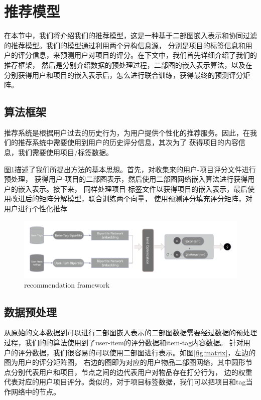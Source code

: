 \documentclass[lang=cn,11pt]{elegantpaper}
\begin{document}
\section{推荐模型}

在本节中，我们将介绍我们的推荐模型，这是一种基于二部图嵌入表示和协同过滤的推荐模型。我们的模型通过利用两个异构信息源，
分别是项目的标签信息和用户的评分信息，来预测用户对项目的评分。在下文中，我们首先详细介绍了我们的推荐框架，
然后是分别介绍数据的预处理过程，二部图的嵌入表示算法，以及在分别获得用户和项目的嵌入表示后，怎么进行联合训练，获得最终的预测评分矩阵。

\subsection{算法框架}
推荐系统是根据用户过去的历史行为，为用户提供个性化的推荐服务。因此，在我们的推荐系统中需要使用到用户的历史评分信息，其次为了
获得项目的内容信息，我们需要使用项目/标签数据。

图\ref{fig:framwork}描述了我们所提出方法的基本思想。首先，对收集来的用户-项目评分文件进行预处理，
获得用户-项目的二部图表示，然后使用二部图网络嵌入算法进行获得用户的嵌入表示。接下来，
同样处理项目-标签文件以获得项目的嵌入表示，最后使用改进后的矩阵分解模型，联合训练两个向量，
使用预测评分填充评分矩阵，对用户进行个性化推荐

\begin{figure}[t]
	\centering
	\includegraphics[width=1.0\textwidth]{imgs/framework.pdf}
	\caption{recommendation framework \label{fig:framwork}}
\end{figure}

\subsection{数据预处理}

从原始的文本数据到可以进行二部图嵌入表示的二部图数据需要经过数据的预处理过程，我们的的算法使用到了user-item的评分数据和item-tag内容数据。
针对用户的评分数据，我们很容易的可以使用二部图进行表示。如图\ref{fig:matrix}，左边的图为用户的评分矩阵图，
右边的图即为对应的用户物品二部图网络，其中圆形节点分别代表用户和项目，节点之间的边代表用户对物品存在打分行为，
边的权重代表对应的用户项目评分。类似的，对于项目标签数据，我们可以把项目和tag当作网络中的节点。
\end{document}
